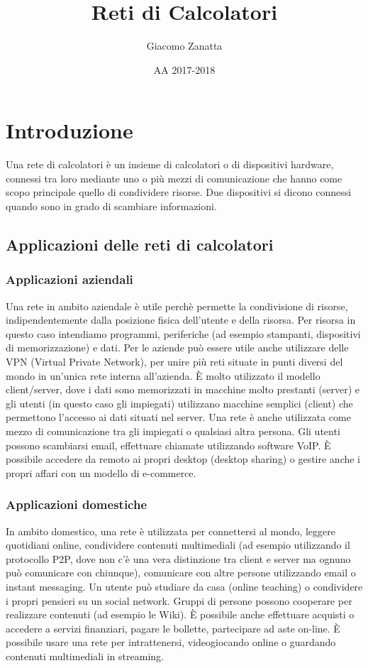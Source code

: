 \documentclass{article}
\title{Reti di Calcolatori}
\date{AA 2017-2018}
\author{Giacomo Zanatta}
\begin{document}
  \maketitle
  \tableofcontents
  \newpage
	\section{Introduzione}
		Una rete di calcolatori è un insieme di calcolatori o di dispositivi hardware, connessi tra loro mediante uno o più mezzi di comunicazione che hanno come scopo principale quello di condividere risorse.
	Due dispositivi si dicono connessi quando sono in grado di scambiare informazioni.
		\subsection{Applicazioni delle reti di calcolatori}
			\subsubsection{Applicazioni aziendali}
			Una rete in ambito aziendale è utile perchè permette la condivisione di risorse, indipendentemente dalla posizione fisica dell'utente e della risorsa.
			Per risorsa in questo caso intendiamo programmi, periferiche (ad esempio stampanti, dispositivi di memorizzazione) e dati.
			Per le aziende può essere utile anche utilizzare delle VPN (Virtual Private Network), per unire più reti situate in punti diversi del mondo in un'unica rete interna all'azienda.
			È  molto utilizzato il modello client/server, dove i dati sono memorizzati in macchine molto prestanti (server) e gli utenti (in questo caso gli impiegati) utilizzano macchine semplici (client) che permettono l'accesso ai dati situati nel server.
			Una rete è anche utilizzata come mezzo di comunicazione tra gli impiegati o qualsiasi altra persona. Gli utenti possono scambiarsi email, effettuare chiamate utilizzando software VoIP. È possibile accedere da remoto ai propri desktop (desktop sharing) o gestire anche i propri affari con un modello di e-commerce.
			\subsubsection{Applicazioni domestiche}
			In ambito domestico, una rete è utilizzata per connettersi al mondo, leggere quotidiani online, condividere contenuti multimediali (ad esempio utilizzando il protocollo P2P, dove non c'è una vera distinzione tra client e server ma ognuno può comunicare con chiunque), comunicare con altre persone utilizzando email o instant messaging. Un utente può studiare da casa (online teaching) o condividere i propri pensieri su un social network. Gruppi di persone possono cooperare per realizzare contenuti (ad esempio le Wiki).
			È possibile anche effettuare acquisti o accedere a servizi finanziari, pagare le bollette, partecipare ad aste on-line.
			È possibile usare una rete per intrattenersi, videogiocando online o guardando contenuti multimediali in streaming.
\end{document}
